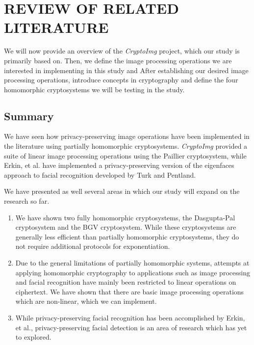 \chapter{REVIEW OF RELATED LITERATURE}

We will now provide an overview of the \textit{CryptoImg} project, which our study is primarily based on. Then, we define the image processing operations we are interested in implementing in this study and
After establishing our desired image processing operations, introduce concepts in cryptography and define the four homomorphic cryptosystems we will be testing in the study.









\section{Summary}
We have seen how privacy-preserving image operations have been implemented in the literature using partially homomorphic cryptosystems. \textit{CryptoImg} provided a suite of linear image processing operations using the Paillier cryptosystem, while Erkin, et al. have implemented a privacy-preserving version of the eigenfaces approach to facial recognition developed by Turk and Pentland.

We have presented as well several areas in which our study will expand on the research so far.
\begin{enumerate}
  \item We have shown two fully homomorphic cryptosystems, the Dasgupta-Pal cryptosystem and the BGV cryptosystem. While these cryptosystems are generally less efficient than partially homomorphic cryptosystems, they do not require additional protocols for exponentiation.
  \item Due to the general limitations of partially homomorphic systems, attempts at applying homomorphic cryptography to applications such as image processing and facial recognition have mainly been restricted to linear operations on ciphertext. We have shown that there are basic image processing operations which are non-linear, which we can implement.
  \item While privacy-preserving facial recognition has been accomplished by Erkin, et al., privacy-preserving facial detection is an area of research which has yet to explored.
\end{enumerate}
